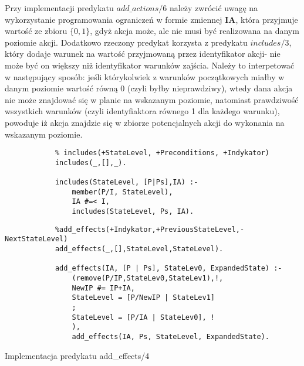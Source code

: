     Przy implementacji predykatu $add\_actions/6$ należy zwrócić uwagę na wykorzystanie programowania ograniczeń w formie zmiennej \textbf{IA}, 
    która przyjmuje wartość ze zbioru $\{0,1\}$, gdyż akcja może, ale nie musi być realizowana na danym poziomie akcji. Dodatkowo rzeczony 
    predykat korzysta z predykatu $includes/3$, który dodaje warunek na wartość przyjmowaną przez identyfikator akcji- nie może być on większy 
    niż identyfikator warunków zajścia. Należy to interpetować w następujący sposób: jeśli którykolwiek z warunków początkowych miałby w danym 
    poziomie wartość równą 0 (czyli byłby nieprawdziwy), wtedy dana akcja nie może znajdować się w planie na wskazanym poziomie, natomiast 
    prawdziwość wszystkich warunków (czyli identyfiaktora równego 1 dla każdego warunku), powoduje iż akcja znajdzie się w zbiorze potencjalnych
    akcji do wykonania na wskazanym poziomie.

    \begin{listing}[H]
        \begin{verbatim}
            % includes(+StateLevel, +Preconditions, +Indykator)
            includes(_,[],_).

            includes(StateLevel, [P|Ps],IA) :-
                member(P/I, StateLevel),
                IA #=< I,
                includes(StateLevel, Ps, IA).
    \end{verbatim}
    \end{listing}

    \begin{listing}[H]
        \begin{verbatim}
            %add_effects(+Indykator,+PreviousStateLevel,-NextStateLevel)
            add_effects(_,[],StateLevel,StateLevel).

            add_effects(IA, [P | Ps], StateLev0, ExpandedState) :-
                (remove(P/IP,StateLev0,StateLev1),!,
                NewIP #= IP+IA,
                StateLevel = [P/NewIP | StateLev1]
                ;
                StateLevel = [P/IA | StateLev0], !
                ),
                add_effects(IA, Ps, StateLevel, ExpandedState).
    \end{verbatim}
    \caption{Implementacja predykatu add\_effects/4}
    \end{listing}
    
